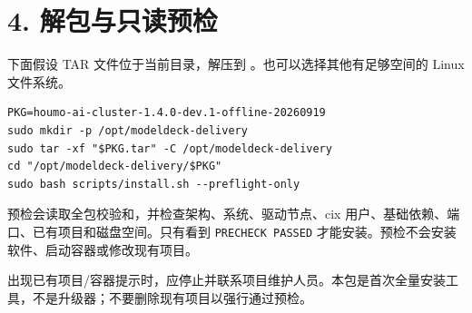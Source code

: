 \documentclass[UTF8,a4paper,zihao=-4,fontset=windows]{ctexart}
\begin{document}
\section*{4. 解包与只读预检}
下面假设 TAR 文件位于当前目录，解压到 。也可以选择其他有足够空间的 Linux 文件系统。\par
\par\noindent\begin{minipage}{\linewidth}\begin{lstlisting}
PKG=houmo-ai-cluster-1.4.0-dev.1-offline-20260919
sudo mkdir -p /opt/modeldeck-delivery
sudo tar -xf "$PKG.tar" -C /opt/modeldeck-delivery
cd "/opt/modeldeck-delivery/$PKG"
sudo bash scripts/install.sh --preflight-only
\end{lstlisting}\end{minipage}\par
预检会读取全包校验和，并检查架构、系统、驱动节点、cix 用户、基础依赖、端口、已有项目和磁盘空间。只有看到 \texttt{PRECHECK PASSED} 才能安装。预检不会安装软件、启动容器或修改现有项目。\par
出现已有项目/容器提示时，应停止并联系项目维护人员。本包是首次全量安装工具，不是升级器；不要删除现有项目以强行通过预检。\par
\end{document}
